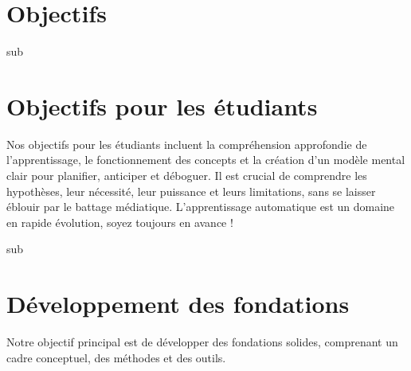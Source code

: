 \documentclass[12pt]{article}
\begin{document}
\section{Objectifs}

sub\section{Objectifs pour les étudiants}

Nos objectifs pour les étudiants incluent la compréhension approfondie de l'apprentissage, le fonctionnement des concepts et la création d'un modèle mental clair pour planifier, anticiper et déboguer. Il est crucial de comprendre les hypothèses, leur nécessité, leur puissance et leurs limitations, sans se laisser éblouir par le battage médiatique. L'apprentissage automatique est un domaine en rapide évolution, soyez toujours en avance !

sub\section{Développement des fondations}

Notre objectif principal est de développer des fondations solides, comprenant un cadre conceptuel, des méthodes et des outils.


\end{document}
